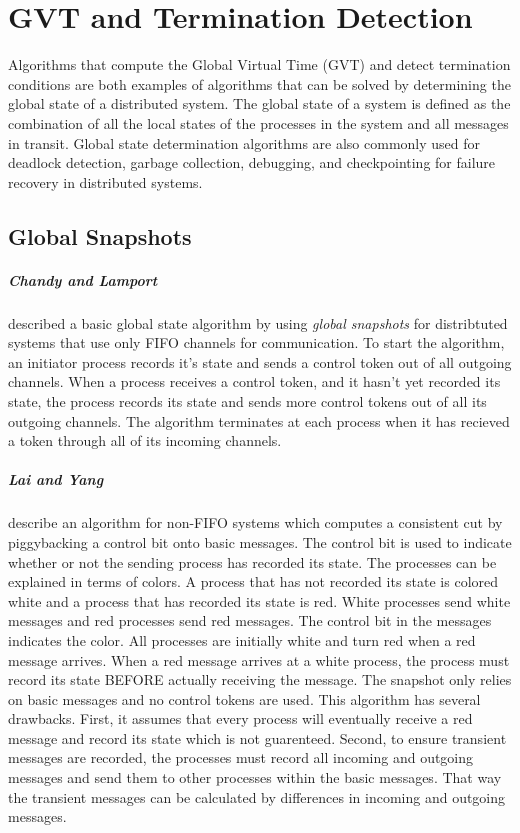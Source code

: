 \documentclass[11pt]{book}
\begin{document}
\chapter{GVT and Termination Detection}\label{gvt_termination}

Algorithms that compute the Global Virtual Time (GVT) and detect termination conditions are
both examples of algorithms that can be solved by determining the global state of a
distributed system.  The global state of a system is defined as the combination of all
the local states of the processes in the system and all messages in transit.  Global state
determination algorithms are also commonly used for deadlock detection, garbage collection,
debugging, and checkpointing for failure recovery in distributed systems.

\section{Global Snapshots}

\paragraph{Chandy and Lamport}\cite{chandy-85} described a basic global state algorithm by
using \emph{global snapshots} for distribtuted systems that use only FIFO channels for
communication.  To start the algorithm, an initiator process records it's state and sends
a control token out of all outgoing channels.  When a process receives a control token, and
it hasn't yet recorded its state, the process records its state and sends more control
tokens out of all its outgoing channels.  The algorithm terminates at each process when it
has recieved a token through all of its incoming channels.

\paragraph{Lai and Yang}\cite{lai-87} describe an algorithm for non-FIFO systems which
computes a consistent cut by piggybacking a control bit onto basic messages.  The control
bit is used to indicate whether or not the sending process has recorded its state.  The
processes can be explained in terms of colors.  A process that has not recorded its state
is colored white and a process that has recorded its state is red.  White processes send
white messages and red processes send red messages.  The control bit in the messages indicates
the color.  All processes are initially white and turn red when a red message arrives.  When
a red message arrives at a white process, the process must record its state BEFORE actually
receiving the message.  The snapshot only relies on basic messages and no control tokens are
used.  This algorithm has several drawbacks.  First, it assumes that every process will
eventually receive a red message and record its state which is not guarenteed.  Second, to
ensure transient messages are recorded, the processes must record all incoming and outgoing
messages and send them to other processes within the basic messages.  That way the transient
messages can be calculated by differences in incoming and outgoing messages.
\end{document}
